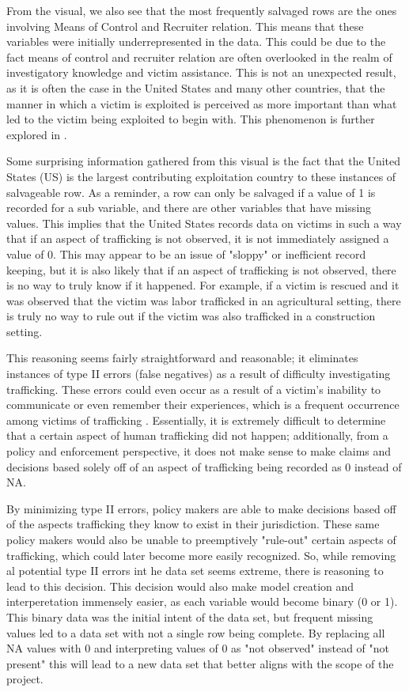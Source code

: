 \documentclass{article} %
\begin{document}
From the visual, we also see that the most frequently salvaged rows are the ones involving Means of Control and Recruiter relation. This means that these variables were initially underrepresented in the data. This could be due to the fact means of control and recruiter relation are often overlooked in the realm of investigatory knowledge and victim assistance. This is not an unexpected result, as it is often the case in the United States and many other countries, that the manner in which a victim is exploited is perceived as more important than what led to the victim being exploited to begin with. This phenomenon is further explored in \cite{MediaRep}.

Some surprising information gathered from this visual is the fact that the United States (US) is the largest contributing exploitation country to these instances of salvageable row. As a reminder, a row can only be salvaged if a value of 1 is recorded for a sub variable, and there are other variables that have missing values. This implies that the United States records data on victims in such a way that if an aspect of trafficking is not observed, it is not immediately assigned a value of 0. This may appear to be an issue of "sloppy" or inefficient record keeping, but it is also likely that if an aspect of trafficking is not observed, there is no way to truly know if it happened. For example, if a victim is rescued and it was observed that the victim was labor trafficked in an agricultural setting, there is truly no way to rule out if the victim was also trafficked in a construction setting. 

This reasoning seems fairly straightforward and reasonable; it eliminates instances of type II errors (false negatives) as a result of difficulty investigating trafficking. These errors could even occur as a result of a victim's inability to communicate or even remember their experiences, which is a frequent occurrence among victims of trafficking \parencite{PTSD}. Essentially, it is extremely difficult to determine that a certain aspect of human trafficking did not happen; additionally, from a policy and enforcement perspective, it does not make sense to make claims and decisions based solely off of an aspect of trafficking being recorded as 0 instead of NA.

By minimizing type II errors, policy makers are able to make decisions based off of the aspects trafficking they know to exist in their jurisdiction. These same policy makers would also be unable to preemptively "rule-out" certain aspects of trafficking, which could later become more easily recognized. So, while removing al potential type II errors int he data set seems extreme, there is reasoning to lead to this decision. This decision would also make model creation and interperetation immensely easier, as each variable would become binary (0 or 1). This binary data was the initial intent of the data set, but frequent missing values led to a data set with not a single row being complete. By replacing all NA values with 0 and interpreting values of 0 as "not observed" instead of "not present" this will lead to a new data set that better aligns with the scope of the project.
\end{document}
